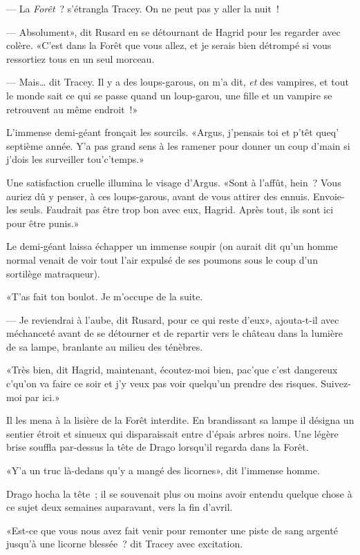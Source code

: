 --- La \emph{Forêt}~? s'étrangla Tracey. On ne peut pas y aller la nuit~!

--- Absolument», dit Rusard en se détournant de Hagrid pour les regarder avec colère. «C'est dans la Forêt que vous allez, et je serais bien détrompé si vous ressortiez tous en un seul morceau.

--- Mais… dit Tracey. Il y a des loups-garous, on m'a dit, \emph{et} des vampires, et tout le monde sait ce qui se passe quand un loup-garou, une fille et un vampire se retrouvent au même endroit~!»

L'immense demi-géant fronçait les sourcils. «Argus, j'pensais toi et p'têt queq' septième année. Y'a pas grand sens à les ramener pour donner un coup d'main si j'dois les surveiller tou'c'temps.»

Une satisfaction cruelle illumina le visage d'Argus. «Sont à l'affût, hein~? Vous auriez dû y penser, à ces loups-garous, avant de vous attirer des ennuis. Envoie-les seuls. Faudrait pas être trop bon avec eux, Hagrid. Après tout, ils sont ici pour être punis.»

Le demi-géant laissa échapper un immense soupir (on aurait dit qu'un homme normal venait de voir tout l'air expulsé de ses poumons sous le coup d'un sortilège matraqueur).

«T'as fait ton boulot. Je m'occupe de la suite.

--- Je reviendrai à l'aube, dit Rusard, pour ce qui reste d'eux», ajouta-t-il avec méchanceté avant de se détourner et de repartir vers le château dans la lumière de sa lampe, branlante au milieu des ténèbres.

«Très bien, dit Hagrid, maintenant, écoutez-moi bien, pac'que c'est dangereux c'qu'on va faire ce soir et j'y veux pas voir quelqu'un prendre des risques. Suivez-moi par ici.»

Il les mena à la lisière de la Forêt interdite. En brandissant sa lampe il désigna un sentier étroit et sinueux qui disparaissait entre d'épais arbres noirs. Une légère brise souffla par-dessus la tête de Drago lorsqu'il regarda dans la Forêt.

«Y'a un truc là-dedans qu'y a mangé des licornes», dit l'immense homme.

Drago hocha la tête~; il se souvenait plus ou moins avoir entendu quelque chose à ce sujet deux semaines auparavant, vers la fin d'avril.

«Est-ce que vous nous avez fait venir pour remonter une piste de sang argenté jusqu'à une licorne blessée~? dit Tracey avec excitation.

